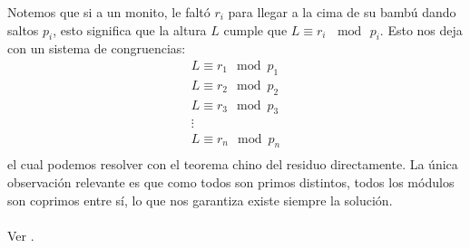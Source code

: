 \begin{center}
\end{center}

Notemos que si a un monito, le faltó $r_i$ para llegar a la cima de su bambú dando saltos $p_i$, esto significa que la altura $L$ cumple que $L\equiv r_i \, \mod \,p_i$. Esto nos deja con un sistema de congruencias:
\begin{align*}
    L \equiv r_1  \mod p_1 \\
    L \equiv r_2  \mod p_2 \\
    L \equiv r_3  \mod p_3 \\
    \vdots \\
    L \equiv r_n \mod p_n \\
\end{align*}
el cual podemos resolver con el teorema chino del residuo directamente. La única observación relevante es que como todos son primos distintos, todos los módulos son coprimos entre sí, lo que nos garantiza existe siempre la solución.
\\\\
Ver .

